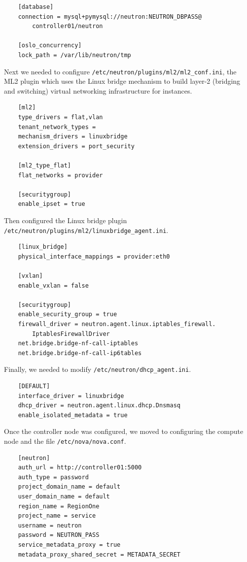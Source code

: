 \documentclass{article}
\begin{document}
\begin{verbatim}
    [database]
    connection = mysql+pymysql://neutron:NEUTRON_DBPASS@
        controller01/neutron

    [oslo_concurrency]
    lock_path = /var/lib/neutron/tmp
\end{verbatim}

Next we needed to configure \texttt{/etc/neutron/plugins/ml2/ml2\_conf.ini}, the ML2 plugin which uses the Linux bridge mechanism to build layer-2 (bridging and switching) virtual networking infrastructure for instances.

\begin{verbatim}
    [ml2]
    type_drivers = flat,vlan
    tenant_network_types =
    mechanism_drivers = linuxbridge
    extension_drivers = port_security

    [ml2_type_flat]
    flat_networks = provider
    
    [securitygroup]
    enable_ipset = true
\end{verbatim}

Then configured the Linux bridge plugin \texttt{/etc/neutron/plugins/ml2/linuxbridge\_agent.ini}.

\begin{verbatim}
    [linux_bridge]
    physical_interface_mappings = provider:eth0

    [vxlan]
    enable_vxlan = false

    [securitygroup]
    enable_security_group = true
    firewall_driver = neutron.agent.linux.iptables_firewall.
        IptablesFirewallDriver
    net.bridge.bridge-nf-call-iptables
    net.bridge.bridge-nf-call-ip6tables
\end{verbatim}

Finally, we needed to modify \texttt{/etc/neutron/dhcp\_agent.ini}.

\begin{verbatim}
    [DEFAULT]
    interface_driver = linuxbridge
    dhcp_driver = neutron.agent.linux.dhcp.Dnsmasq
    enable_isolated_metadata = true
\end{verbatim}

Once the controller node was configured, we moved to configuring the compute node and the file \texttt{/etc/nova/nova.conf}.

\begin{verbatim}
    [neutron]
    auth_url = http://controller01:5000
    auth_type = password
    project_domain_name = default
    user_domain_name = default
    region_name = RegionOne
    project_name = service
    username = neutron
    password = NEUTRON_PASS
    service_metadata_proxy = true
    metadata_proxy_shared_secret = METADATA_SECRET
\end{verbatim}
\end{document}
